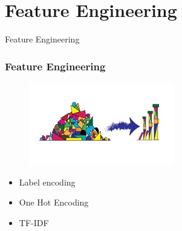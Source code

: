 \documentclass[11pt]{beamer}
\begin{document}
\section{Feature Engineering}
\begin{frame}{Feature Engineering}
\frametitle{Feature Engineering}

\begin{figure}
	\includegraphics[width=\linewidth,height=0.4\linewidth]{featureengineering}
	
\end{figure}
\begin{itemize}
	\item Label encoding
	\item One Hot Encoding
	\item TF-IDF
\end{itemize}


\end{frame}	
	
\end{document}
